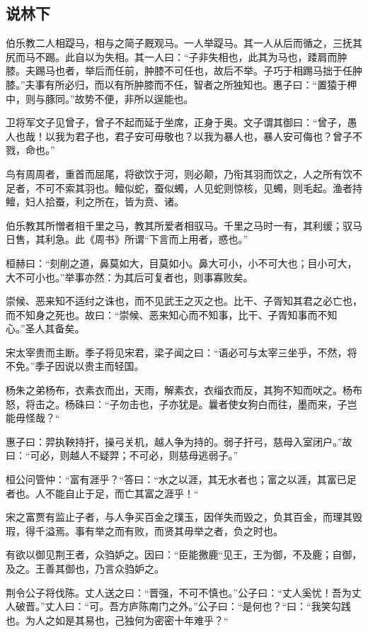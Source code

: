 \documentclass[]{article}
\begin{document}
\hypertarget{header-n1028}{%
\subsection{说林下}\label{header-n1028}}

伯乐教二人相踶马，相与之简子厩观马。一人举踶马。其一人从后而循之，三抚其尻而马不踢。此自以为失相。其一人曰：``子非失相也，此其为马也，踒肩而肿膝。夫踢马也者，举后而任前，肿膝不可任也，故后不举。子巧于相踢马拙于任肿膝。''夫事有所必归，而以有所肿膝而不任，智者之所独知也。惠子曰：``置猿于柙中，则与豚同。''故势不便，非所以逞能也。

卫将军文子见曾子，曾子不起而延于坐席，正身于奥。文子谓其御曰：``曾子，愚人也哉！以我为君子也，君子安可毋敬也？以我为暴人也，暴人安可侮也？曾子不戮，命也。''

鸟有周周者，重首而屈尾，将欲饮于河，则必颠，乃衔其羽而饮之，人之所有饮不足者，不可不索其羽也。鳣似蛇，蚕似蠋，人见蛇则惊核，见蠋，则毛起。渔者持鳣，妇人拾蚕，利之所在，皆为贲、诸。

伯乐教其所憎者相千里之马，教其所爱者相驭马。千里之马时一有，其利缓；驭马日售，其利急。此《周书》所谓``下言而上用者，惑也。''

桓赫曰：``刻削之道，鼻莫如大，目莫如小。鼻大可小，小不可大也；目小可大，大不可小也。''举事亦然：为其后可复者也，则事寡败矣。

崇候、恶来知不适纣之诛也，而不见武王之灭之也。比干、子胥知其君之必亡也，而不知身之死也。故曰：``崇候、恶来知心而不知事，比干、子胥知事而不知心。''圣人其备矣。

宋太宰贵而主断。季子将见宋君，梁子闻之曰：``语必可与太宰三坐乎，不然，将不免。''季子因说以贵主而轻国。

杨朱之弟杨布，衣素衣而出，天雨，解素衣，衣缁衣而反，其狗不知而吠之。杨布怒，将击之。杨硃曰：``子勿击也，子亦犹是。曩者使女狗白而往，墨而来，子岂能毋怪哉？``

惠子曰：羿执鞅持扞，操弓关机，越人争为持的。弱子扞弓，慈母入室闭户。''故曰：``可必，则越人不疑羿；不可必，则慈母逃弱子。''

桓公问管仲：``富有涯乎？``答曰：``水之以涯，其无水者也；富之以涯，其富已足者也。人不能自止于足，而亡其富之涯乎！``

宋之富贾有监止子者，与人争买百金之璞玉，因佯失而毁之，负其百金，而理其毁瑕，得千溢焉。事有举之而有败，而贤其毋举之者，负之时也。

有欲以御见荆王者，众驺妒之。因曰：``臣能撽鹿``见王，王为御，不及鹿；自御，及之。王善其御也，乃言众驺妒之。

荆令公子将伐陈。丈人送之曰：``晋强，不可不慎也。''公子曰：``丈人奚忧！吾为丈人破晋。''丈人曰：``可。吾方庐陈南门之外。''公子曰：``是何也？``曰：``我笑勾践也。为人之如是其易也，己独何为密密十年难乎？``
\end{document}
